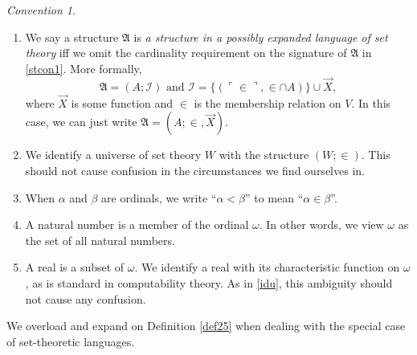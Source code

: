 \documentclass[12pt, twoside]{memoir}
\numberwithin{equation}{section}
\theoremstyle{definition}
\theoremstyle{remark}
\newtheorem{con}[thm]{Convention}
\theoremstyle{definition}
\theoremstyle{definition}
\theoremstyle{definition}
\theoremstyle{remark}
\begin{document}
\begin{con}
\begin{enumerate}[label=(\arabic*)]
    \item We say a structure $\mathfrak{A}$ is \emph{a structure in a possibly expanded language of set theory} iff we omit the cardinality requirement on the signature of $\mathfrak{A}$ in \ref{stcon1}. More formally, $$\mathfrak{A} = (A; \mathcal{I}) \text{ and } \mathcal{I} = \{(\ulcorner \in \urcorner, \in \cap A)\} \cup \Vec{X},$$ where $\Vec{X}$ is some function and $\in$ is the membership relation on $V$. In this case, we can just write $\mathfrak{A} = (A; \in, \Vec{X})$.
    \item\label{idu} We identify a universe of set theory $W$ with the structure $(W; \in)$. This should not cause confusion in the circumstances we find ourselves in.
    \item When $\alpha$ and $\beta$ are ordinals, we write ``$\alpha < \beta$'' to mean ``$\alpha \in \beta$''.
    \item A natural number is a member of the ordinal $\omega$. In other words, we view $\omega$ as the set of all natural numbers.
    \item A real is a subset of $\omega$. We identify a real with its characteristic function on $\omega$, as is standard in computability theory. As in \ref{idu}, this ambiguity should not cause any confusion.
\end{enumerate}
\end{con}

We overload and expand on Definition \ref{def25} when dealing with the special case of set-theoretic languages. 
\end{document}
